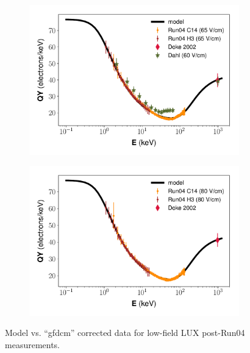 \begin{figure}[!h]
\begin{subfigure}{0.5\linewidth}
\caption{}
\end{subfigure}
\begin{subfigure}{0.5\linewidth}
\includegraphics[width=\linewidth]{Figures/Yields_fit_new/NEST_fit_65Vcm_new.pdf}
\caption{}
\end{subfigure}%
\begin{subfigure}{0.5\linewidth}
\includegraphics[width=\linewidth]{Figures/Yields_fit_new/NEST_fit_80Vcm_new.pdf}
\caption{}
\end{subfigure}
\caption{Model vs. ``gfdcm'' corrected data for low-field LUX post-Run04 measurements.}
\label{fig:betamod_lowfield}
\end{figure}
